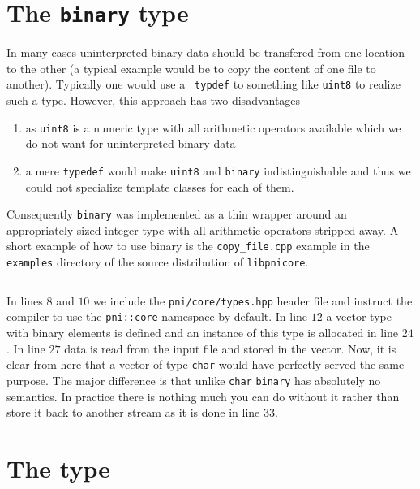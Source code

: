 \section{The \texttt{binary} type}\label{section:using_binary}

In many cases uninterpreted binary data should be transfered from one location
to the other (a typical example would be to copy the content of one file to
another).
Typically one would use a \texttt{ typdef} to something like \texttt{uint8} to realize
such a type. However, this approach has two disadvantages
\begin{enumerate}
\item as \texttt{uint8} is a numeric type with all arithmetic operators available
which we do not want for uninterpreted binary data 
\item a mere \texttt{typedef} would make \texttt{uint8} and \texttt{binary} 
indistinguishable and thus we could not specialize template classes for each of
them.
\end{enumerate}
Consequently \texttt{binary} was implemented as a thin wrapper around an
appropriately sized integer type with all arithmetic operators stripped away.
A short example of how to use binary is the \texttt{copy\_file.cpp} example in the
\texttt{examples} directory of the source distribution of \texttt{libpnicore}. 

\inputminted[linenos,
             firstline=24,
             frame=lines,
             label=examples/copy\_file.cpp]
{cpp}{../examples/copy_file.cpp}

In lines $8$ and $10$ we include the \texttt{pni/core/types.hpp} header file and
instruct the compiler to use the \texttt{pni::core} namespace by default. In line
$12$ a vector type with binary elements is defined and an instance of this type
is allocated in line $24$. 
In line $27$ data is read from the input file and stored in the vector. Now, it
is clear from here that a vector of type  \texttt{char} would have perfectly served
the same purpose. The major difference is that unlike \texttt{char} \texttt{binary}
has absolutely no semantics. In practice there is nothing much you can do
without it rather than store it back to another stream as it is done in 
line $33$.

\section{The  type}\label{section:using_none}

